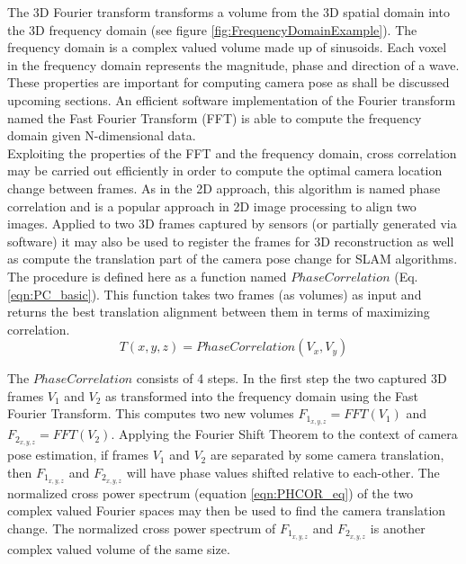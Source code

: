 The 3D Fourier transform transforms a volume from the 3D spatial domain into the 3D frequency domain (see figure \ref{fig:FrequencyDomainExample}). The frequency domain is a complex valued volume made up of sinusoids. Each voxel in the frequency domain represents the magnitude, phase and direction of a wave. These properties are important for computing camera pose as shall be discussed upcoming sections. An efficient software implementation of the Fourier transform named the Fast Fourier Transform (FFT) is able to compute the frequency domain given N-dimensional data. \\

Exploiting the properties of the FFT and the frequency domain, cross correlation may be carried out efficiently in order to compute the optimal camera location change between frames. As in the 2D approach, this algorithm is named phase correlation and is a popular approach in 2D image processing to align two images. Applied to two 3D frames captured by sensors (or partially generated via software) it may also be used to register the frames for 3D reconstruction as well as compute the translation part of the camera pose change for SLAM algorithms. The procedure is defined here as a function named $PhaseCorrelation$ (Eq. \ref{eqn:PC_basic}). This function takes two frames (as volumes) as input and returns the best translation alignment between them in terms of maximizing correlation.  \\

\begin{equation} \label{eqn:PC_basic}
T(x, y, z) = PhaseCorrelation(V_x, V_y)
\end{equation}

The $PhaseCorrelation$ consists of 4 steps. In the first step the two captured 3D frames $V_1$ and $V_2$ as transformed into the frequency domain using the Fast Fourier Transform. This computes two new volumes $F_{1_{x,y,z}} = FFT(V_1)$ and $F_{2_{x,y,z}} = FFT(V_2)$. Applying the Fourier Shift Theorem to the context of camera pose estimation, if frames $V_1$ and $V_2$ are separated by some camera translation, then $F_{1_{x,y,z}}$ and $F_{2_{x,y,z}}$ will have phase values shifted relative to each-other. The normalized cross power spectrum (equation \ref{eqn:PHCOR_eq}) of the two complex valued Fourier spaces may then be used to find the camera translation change. The normalized cross power spectrum of $F_{1_{x,y,z}}$ and $F_{2_{x,y,z}}$ is another complex valued volume of the same size. \\

